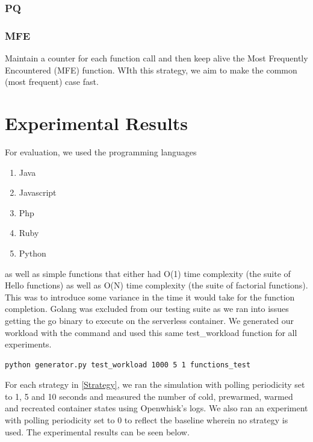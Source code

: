 \documentclass{article}
\begin{document}
\subsubsection{PQ}


\subsubsection{MFE}

Maintain a counter for each function call and then keep alive the Most Frequently Encountered (MFE) function. WIth this strategy, we aim to make the common (most frequent) case fast.

\section{Experimental Results}

For evaluation, we used the programming languages

\begin{enumerate}
    \item Java
    \item Javascript
    \item Php
    \item Ruby
    \item Python
\end{enumerate}

as well as simple functions that either had O(1) time complexity (the suite of Hello functions) as well as O(N) time complexity (the suite of factorial functions). This was to introduce some variance in the time it would take for the function completion. Golang was excluded from our testing suite as we ran into issues getting the go binary to execute on the serverless container. We generated our workload with the command and used this same test\_workload function for all experiments.

\begin{lstlisting}[language=bash,caption={Generating the workload}]
python generator.py test_workload 1000 5 1 functions_test 
\end{lstlisting}

For each strategy in \ref{Strategy}, we ran the simulation with polling periodicity set to 1, 5 and 10 seconds and measured the number of cold, prewarmed, warmed and recreated container states using Openwhisk's logs. We also ran an experiment with polling periodicity set to 0 to reflect the baseline wherein no strategy is used. The experimental results can be seen below.
\end{document}
